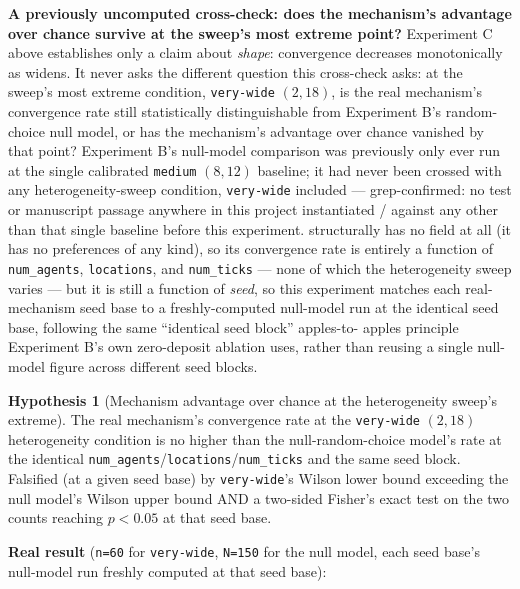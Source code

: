 \documentclass[
  english,
]{article}
\newcounter{none} %
\theoremstyle{definition}
\newtheorem{hypothesis}[theorem]{Hypothesis}
\begin{document}
\textbf{A previously uncomputed cross-check: does the mechanism's
advantage over chance survive at the sweep's most extreme point?}
Experiment C above establishes only a claim about \emph{shape}:
convergence decreases monotonically as 
widens. It never asks the different question this cross-check asks: at
the sweep's most extreme condition, \texttt{very-wide} \((2, 18)\), is
the real mechanism's convergence rate still statistically
distinguishable from Experiment B's random-choice null model, or has the
mechanism's advantage over chance vanished by that point? Experiment B's
null-model comparison was previously only ever run at the single
calibrated \texttt{medium} \((8, 12)\) baseline; it had never been
crossed with any heterogeneity-sweep condition, \texttt{very-wide}
included --- grep-confirmed: no test or manuscript passage anywhere in
this project instantiated
/ against
any  other than that single baseline
before this experiment.  structurally has
no  field at all (it has no preferences
of any kind), so its convergence rate is entirely a function of
\texttt{num\_agents}, \texttt{locations}, and \texttt{num\_ticks} ---
none of which the heterogeneity sweep varies --- but it is still a
function of \emph{seed}, so this experiment matches each real-mechanism
seed base to a freshly-computed null-model run at the identical seed
base, following the same ``identical seed block'' apples-to- apples
principle Experiment B's own zero-deposit ablation uses, rather than
reusing a single null-model figure across different seed blocks.

\begin{hypothesis}[Mechanism advantage over chance at the heterogeneity sweep's extreme]
The real mechanism's convergence rate at the \texttt{very-wide} $(2, 18)$ heterogeneity
condition is no higher than the null-random-choice model's rate at the identical
\texttt{num\_agents}/\texttt{locations}/\texttt{num\_ticks} and the same seed block. Falsified (at a
given seed base) by \texttt{very-wide}'s Wilson lower bound exceeding the null model's Wilson upper
bound AND a two-sided Fisher's exact test on the two counts reaching $p < 0.05$ at that seed base.
\end{hypothesis}

\textbf{Real result} (\texttt{n=60} for \texttt{very-wide},
\texttt{N=150} for the null model, each seed base's null-model run
freshly computed at that seed base):
\end{document}
